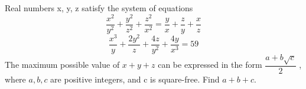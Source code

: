 Real numbers x, y, z satisfy the system of equations \[\dfrac{x^2}{y^2}+\dfrac{y^2}{z^2} +\dfrac{z^2}{x^2} =\dfrac{y}{x}+\dfrac{z}{y}+\dfrac{x}{z} \]\[\dfrac{x^3}{y}+\dfrac{2y^2}{z}+\dfrac{4z}{y^2} +\dfrac{4y}{x^3} = 59\]The maximum possible value of $x+y+z$ can be expressed in the form $\dfrac{a+b\sqrt{c}}{2}$ , where $a, b, c$ are positive integers, and c is square-free. Find $a + b + c$.
